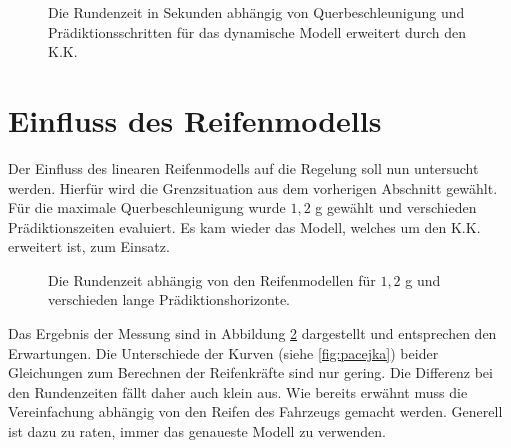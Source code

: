 \documentclass{like}
\begin{document}
\begin{figure}
	\centering
	 
	\caption{Die Rundenzeit in Sekunden abhängig von Querbeschleunigung und Prädiktionsschritten für das dynamische Modell erweitert durch den \ac{K.K.}}
	\label{fig:betaMaxFineKam}
\end{figure}

\section{Einfluss des Reifenmodells}
Der Einfluss des linearen Reifenmodells auf die Regelung soll nun untersucht werden. Hierfür wird die Grenzsituation aus dem vorherigen Abschnitt gewählt. Für die maximale Querbeschleunigung wurde $1,2$ g gewählt und verschieden Prädiktionszeiten evaluiert. Es kam wieder das Modell, welches um den \ac{K.K.} erweitert ist, zum Einsatz.

\begin{figure}[ht!]
	\centering
	 
	\caption{Die Rundenzeit abhängig von den Reifenmodellen für $1,2$ g und verschieden lange Prädiktionshorizonte.}
	\label{fig:tireModelDiff}
\end{figure}

Das Ergebnis der Messung sind in Abbildung \ref{fig:tireModelDiff} dargestellt und entsprechen den Erwartungen. Die Unterschiede der Kurven (siehe \ref{fig:pacejka}) beider Gleichungen zum Berechnen der Reifenkräfte sind nur gering. Die Differenz bei den Rundenzeiten fällt daher auch klein aus. Wie bereits erwähnt muss die Vereinfachung abhängig von den Reifen des Fahrzeugs gemacht werden. Generell ist dazu zu raten, immer das genaueste Modell zu verwenden.
\end{document}
